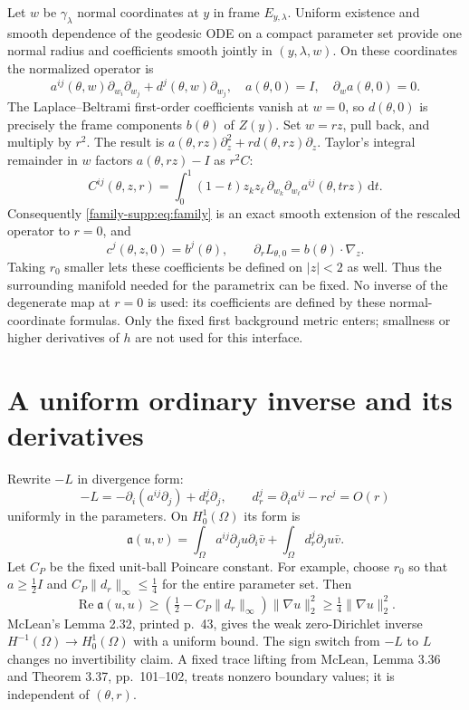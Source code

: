 \documentclass[11pt]{article}
\theoremstyle{definition}
\theoremstyle{remark}
\newcommand{\dd}{\mathrm d}
\numberwithin{equation}{section}
\providecommand{\la}{\lambda}
\providecommand{\tht}{\theta}
\begin{document}
Let $w$ be $\gamma_\la$ normal coordinates at $y$ in frame $E_{y,\la}$.
Uniform existence and smooth dependence of the geodesic ODE on a compact
parameter set provide one normal radius and coefficients smooth jointly
in $(y,\la,w)$. On these coordinates the normalized operator is
\[
 a^{ij}(\tht,w)\partial_{w_i}\partial_{w_j}
                          +d^j(\tht,w)\partial_{w_j},
 \quad a(\tht,0)=I,\quad \partial_w a(\tht,0)=0.
\]
The Laplace--Beltrami first-order coefficients vanish at $w=0$, so
$d(\tht,0)$ is precisely the frame components $b(\tht)$ of $Z(y)$.
Set $w=rz$, pull back, and multiply by $r^2$. The result is
$a(\tht,rz)\partial_z^2+r d(\tht,rz)\partial_z$.
Taylor's integral remainder in $w$ factors $a(\tht,rz)-I$ as $r^2C$:
\[
 C^{ij}(\tht,z,r)=\int_0^1(1-t)
              z_kz_\ell\,\partial_{w_k}\partial_{w_\ell}
                         a^{ij}(\tht,trz)\,\dd t.
\]
Consequently \eqref{family-supp:eq:family} is an exact smooth extension of the
rescaled operator to $r=0$, and
\begin{equation}\label{family-supp:eq:constantdrift}
 c^j(\tht,z,0)=b^j(\tht),\qquad
 \partial_rL_{\tht,0}=b(\tht)\cdot\nabla_z.
\end{equation}
Taking $r_0$ smaller lets these coefficients be defined on $|z|<2$ as
well. Thus the surrounding manifold needed for the parametrix can be fixed.
No inverse of the degenerate map at $r=0$ is used: its coefficients are
defined by these normal-coordinate formulas. Only the fixed first
background metric enters; smallness or higher derivatives of $h$ are
not used for this interface.

\section{A uniform ordinary inverse and its derivatives}\label{family-supp:sec:inverse}

Rewrite $-L$ in divergence form:
\[
 -L=-\partial_i(a^{ij}\partial_j)+d_r^j\partial_j,
 \qquad d_r^j=\partial_i a^{ij}-r c^j=O(r)
\]
uniformly in the parameters. On $H^1_0(\Omega)$ its form is
\[
 \mathfrak a(u,v)=\int_\Omega a^{ij}\partial_j u\partial_i\bar v
                      +\int_\Omega d_r^j\partial_j u\bar v.
\]
Let $C_P$ be the fixed unit-ball Poincare constant. For example, choose
$r_0$ so that $a\geq\tfrac12I$ and
$C_P\|d_r\|_\infty\leq\tfrac14$ for the entire parameter set. Then
\begin{equation}\label{family-supp:eq:coercivity}
 \operatorname{Re}\mathfrak a(u,u)
  \geq\left(\tfrac12-C_P\|d_r\|_\infty\right)\|\nabla u\|_2^2
  \geq\tfrac14\|\nabla u\|_2^2.
\end{equation}
McLean's Lemma 2.32, printed p.~43, gives the weak zero-Dirichlet inverse
$H^{-1}(\Omega)\to H^1_0(\Omega)$ with a uniform bound. The sign switch
from $-L$ to $L$ changes no invertibility claim. A fixed trace lifting
from McLean, Lemma 3.36 and Theorem 3.37, pp.~101--102, treats nonzero
boundary values; it is independent of $(\tht,r)$.
\end{document}
